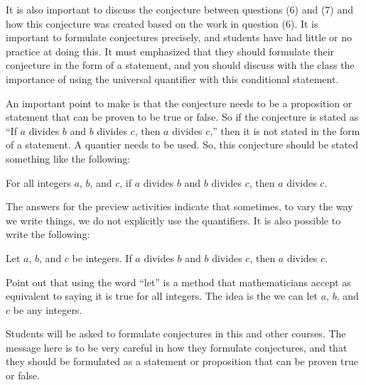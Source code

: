 It is also important to discuss the conjecture between questions (6) and (7) and how this conjecture was created based on the work in question (6).  It is important to formulate conjectures precisely, and students have had little or no practice at doing this.  It must emphasized that they should formulate their conjecture in the form of a statement, and you should discuss with the class the importance of using the universal quantifier with this conditional statement.

An important point to make is that the conjecture needs to be a proposition or statement that can be proven to be true or false.  So if the conjecture is stated as ``If $a$ divides $b$ and $b$ divides $c$, then $a$ divides $c$,'' then it is not stated in the form of a statement.  A quantier needs to be used. So, this conjecture should be stated something like the following:

\begin{center}
For all integers $a$, $b$, and  $c$, if $a$ divides $b$ and $b$ divides $c$, then $a$ divides $c$.
\end{center}

The answers for the preview activities indicate that sometimes, to vary the way we write things, we do not explicitly use the quantifiers.  It is also possible to write the following:

\vskip6pt
Let $a$, $b$, and  $c$  be integers.  If $a$ divides $b$ and $b$ divides $c$, then $a$ divides 
$c$.
\vskip6pt

Point out that using the word ``let'' is a method that mathematicians accept as equivalent to saying it is true for all integers.  The idea is the we can let $a$, $b$, and  $c$  be any integers.

Students will be asked to formulate conjectures in this and other courses.  The message here is to be very careful in how they formulate conjectures, and that they should be formulated as a statement or proposition that can be proven true or false.




